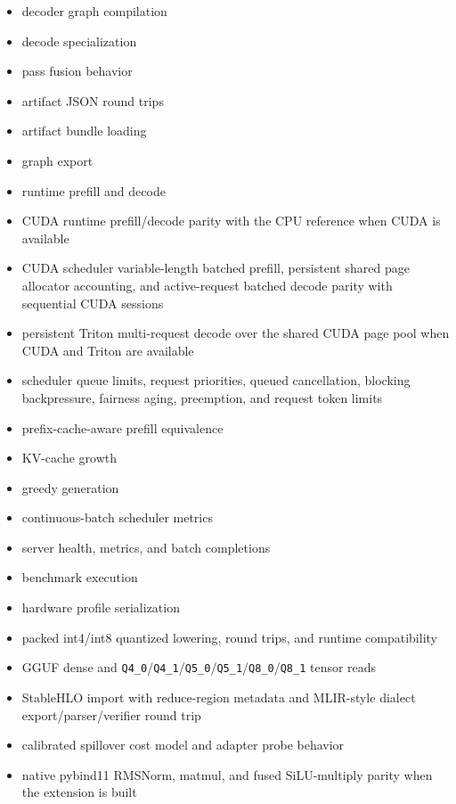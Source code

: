 \documentclass[11pt]{article}
\begin{document}
\begin{itemize}[leftmargin=*]
  \item decoder graph compilation
  \item decode specialization
  \item pass fusion behavior
  \item artifact JSON round trips
  \item artifact bundle loading
  \item graph export
  \item runtime prefill and decode
  \item CUDA runtime prefill/decode parity with the CPU reference when CUDA is
        available
  \item CUDA scheduler variable-length batched prefill, persistent shared page
        allocator accounting, and active-request batched decode parity with
        sequential CUDA sessions
  \item persistent Triton multi-request decode over the shared CUDA page pool
        when CUDA and Triton are available
  \item scheduler queue limits, request priorities, queued cancellation,
        blocking backpressure, fairness aging, preemption, and request token
        limits
  \item prefix-cache-aware prefill equivalence
  \item KV-cache growth
  \item greedy generation
  \item continuous-batch scheduler metrics
  \item server health, metrics, and batch completions
  \item benchmark execution
  \item hardware profile serialization
  \item packed int4/int8 quantized lowering, round trips, and runtime
        compatibility
  \item GGUF dense and \texttt{Q4\_0}/\texttt{Q4\_1}/\texttt{Q5\_0}/\texttt{Q5\_1}/\texttt{Q8\_0}/\texttt{Q8\_1} tensor reads
  \item StableHLO import with reduce-region metadata and MLIR-style dialect export/parser/verifier round trip
  \item calibrated spillover cost model and adapter probe behavior
  \item native pybind11 RMSNorm, matmul, and fused SiLU-multiply parity when the extension is built
\end{itemize}
\end{document}
